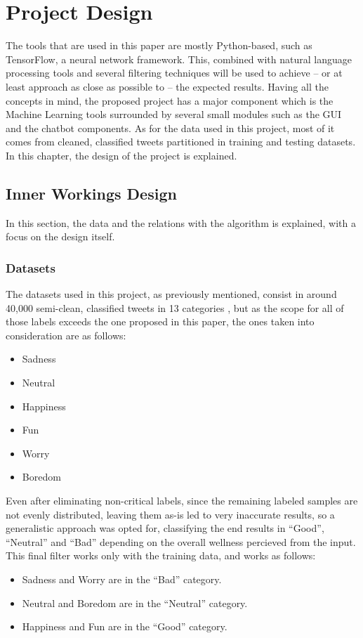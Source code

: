 \chapter{Project Design}
The tools that are used in this paper are mostly Python-based, such as TensorFlow, a neural network framework. This, combined with natural language processing tools and several filtering techniques will be used to achieve -- or at least approach as close as possible to -- the expected results.
Having all the concepts in mind, the proposed project has a major component which is the Machine Learning tools surrounded by several small modules such as the GUI and the chatbot components.
As for the data used in this project, most of it comes from cleaned, classified tweets partitioned in training and testing datasets.
In this chapter, the design of the project is explained.

\section{Inner Workings Design}
In this section, the data and the relations with the algorithm is explained, with a focus on the design itself.
\subsection{Datasets}
The datasets used in this project, as previously mentioned, consist in around 40,000 semi-clean, classified tweets in 13 categories \citep{rf20}, but as the scope for all of those labels exceeds the one proposed in this paper, the ones taken into consideration are as follows:
\begin{itemize}
	\item Sadness
	\item Neutral
	\item Happiness
	\item Fun
	\item Worry
	\item Boredom
\end{itemize}
Even after eliminating non-critical labels, since the remaining  labeled samples are not evenly distributed, leaving them as-is led to very inaccurate results, so a generalistic approach was opted for, classifying the end results in ``Good'', ``Neutral'' and ``Bad'' depending on the overall wellness percieved from the input.
This final filter works only with the training data, and works as follows:
\begin{itemize}
	\item Sadness and Worry are in the ``Bad'' category.
	\item Neutral and Boredom are in the ``Neutral'' category.
	\item Happiness and Fun are in the ``Good'' category.
\end{itemize}

